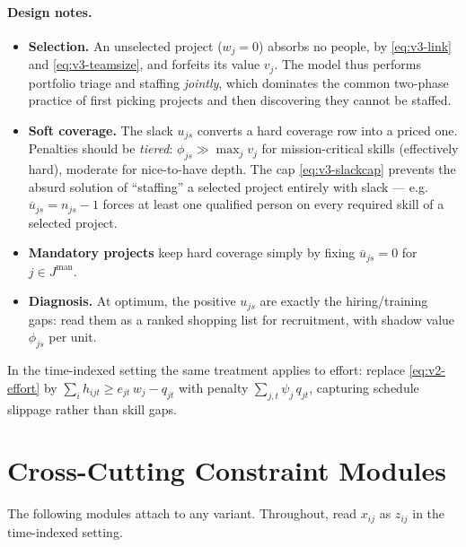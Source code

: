 \documentclass[11pt]{article}
\theoremstyle{remark}
\begin{document}
\paragraph{Design notes.}
\begin{itemize}
\item \textbf{Selection.} An unselected project ($w_j = 0$) absorbs no
  people, by \eqref{eq:v3-link} and \eqref{eq:v3-teamsize}, and forfeits its
  value $v_j$. The model thus performs portfolio triage and staffing
  \emph{jointly}, which dominates the common two-phase practice of first
  picking projects and then discovering they cannot be staffed.
\item \textbf{Soft coverage.} The slack $u_{js}$ converts a hard coverage
  row into a priced one. Penalties should be \emph{tiered}:
  $\phi_{js} \gg \max_j v_j$ for mission-critical skills (effectively hard),
  moderate for nice-to-have depth. The cap \eqref{eq:v3-slackcap} prevents
  the absurd solution of ``staffing'' a selected project entirely with slack
  --- e.g.\ $\overline{u}_{js} = n_{js} - 1$ forces at least one qualified
  person on every required skill of a selected project.
\item \textbf{Mandatory projects} keep hard coverage simply by fixing
  $\overline{u}_{js} = 0$ for $j \in J^{\mathrm{man}}$.
\item \textbf{Diagnosis.} At optimum, the positive $u_{js}$ are exactly the
  hiring/training gaps: read them as a ranked shopping list for
  recruitment, with shadow value $\phi_{js}$ per unit.
\end{itemize}

In the time-indexed setting the same treatment applies to effort:
replace \eqref{eq:v2-effort} by
$\sum_i h_{ijt} \ge e_{jt}\, w_j - q_{jt}$ with penalty
$\sum_{j,t} \psi_j\, q_{jt}$, capturing schedule slippage rather than
skill gaps.

\section{Cross-Cutting Constraint Modules}

The following modules attach to any variant. Throughout, read $x_{ij}$ as
$z_{ij}$ in the time-indexed setting.
\end{document}
